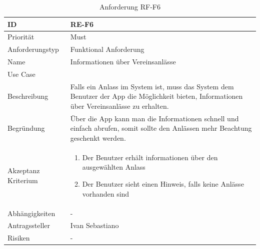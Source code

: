 \begin{table}[ht]
\centering
  \begin{tabular}{ l | p{8cm} }
	\hline
	\rowcolor{gray}
	ID 			&	\textbf{RE-F6}\\ \hline
	Priorität 		&	Must\\ \hline
	Anforderungstyp	&	Funktional Anforderung\\ \hline
	Name 			&	Informationen über Vereinsanlässe\\ \hline
	Use Case 		&	\nameref{table:use_case_5}\\ \hline
	Beschreibung 	&	Falls ein Anlass im System ist, muss das System dem Benutzer der App die Möglichkeit bieten, Informationen über Vereinsanlässe zu erhalten.\\ \hline
	Begründung 		&	Über die App kann man die Informationen schnell und einfach abrufen, somit sollte den Anlässen mehr Beachtung geschenkt werden.\\ \hline
	Akzeptanz Kriterium	&	\begin{enumerate}
					\item Der Benutzer erhält informationen über den ausgewählten Anlass
					\item Der Benutzer sieht einen Hinweis, falls keine Anlässe vorhanden sind
					\end{enumerate}
					\\ \hline
	Abhängigkeiten 	&	-\\ \hline
	Antragssteller 	&	Ivan Sebastiano\\ \hline
	Risiken	 	&	-
  \end{tabular}
   \caption{Anforderung RF-F6}\label{table:req_6}
\end{table}

